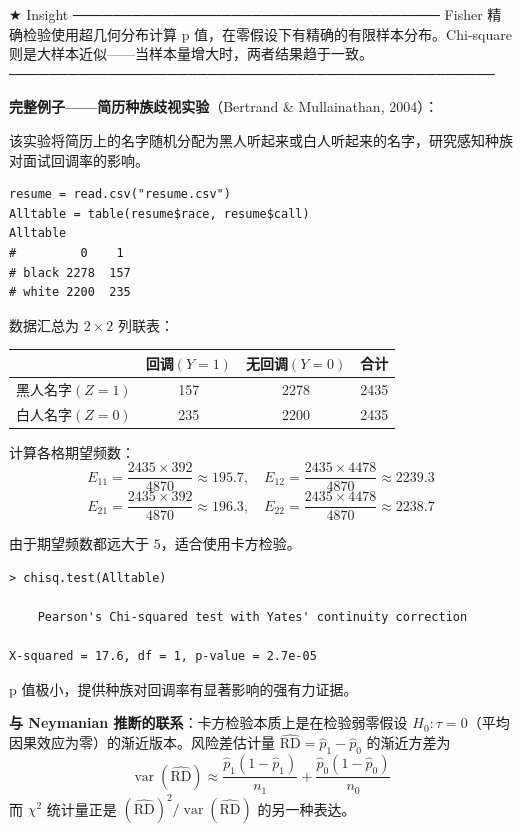 ★ Insight ─────────────────────────────────────
Fisher 精确检验使用超几何分布计算 p 值，在零假设下有精确的有限样本分布。Chi-square 则是大样本近似——当样本量增大时，两者结果趋于一致。
─────────────────────────────────────────────────

\textbf{完整例子——简历种族歧视实验}（Bertrand \& Mullainathan, 2004）：

该实验将简历上的名字随机分配为黑人听起来或白人听起来的名字，研究感知种族对面试回调率的影响。

\begin{verbatim}
resume = read.csv("resume.csv")
Alltable = table(resume$race, resume$call)
Alltable
#         0    1
# black 2278  157
# white 2200  235
\end{verbatim}

数据汇总为 $2 \times 2$ 列联表：

\begin{center}
\begin{tabular}{lccc}
\hline
        & 回调$(Y=1)$ & 无回调$(Y=0)$ & 合计\\\hline
黑人名字$(Z=1)$ & 157 & 2278 & 2435\\
白人名字$(Z=0)$ & 235 & 2200 & 2435\\\hline
\end{tabular}
\end{center}

计算各格期望频数：
\[
E_{11} = \frac{2435 \times 392}{4870} \approx 195.7, \quad
E_{12} = \frac{2435 \times 4478}{4870} \approx 2239.3
\]
\[
E_{21} = \frac{2435 \times 392}{4870} \approx 196.3, \quad
E_{22} = \frac{2435 \times 4478}{4870} \approx 2238.7
\]

由于期望频数都远大于 $5$，适合使用卡方检验。

\begin{verbatim}
> chisq.test(Alltable)

    Pearson's Chi-squared test with Yates' continuity correction

X-squared = 17.6, df = 1, p-value = 2.7e-05
\end{verbatim}

p 值极小，提供种族对回调率有显著影响的强有力证据。

\textbf{与 Neymanian 推断的联系}：卡方检验本质上是在检验弱零假设 $H_0: \tau = 0$（平均因果效应为零）的渐近版本。风险差估计量 $\widehat{\text{RD}} = \hat{p}_1 - \hat{p}_0$ 的渐近方差为
\[
\operatorname{var}(\widehat{\text{RD}}) \approx \frac{\hat{p}_1(1-\hat{p}_1)}{n_1} + \frac{\hat{p}_0(1-\hat{p}_0)}{n_0}
\]
而 $\chi^2$ 统计量正是 $(\widehat{\text{RD}})^2 / \operatorname{var}(\widehat{\text{RD}})$ 的另一种表达。

